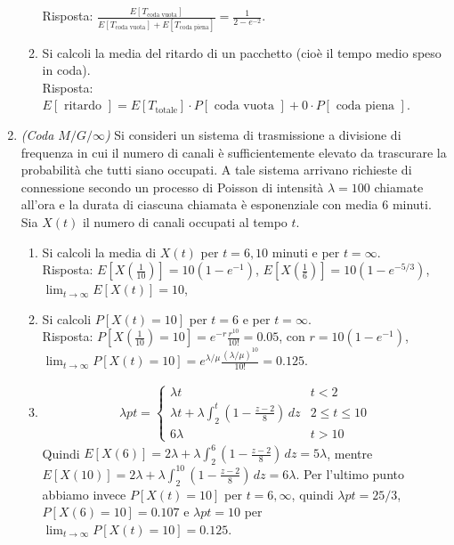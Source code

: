 \documentclass{article}
\begin{document}
\begin{enumerate}
\begin{enumerate}[label=\alph*)]
        Risposta: $\frac{E[T_{\text{coda vuota}}]}{E[T_{\text{coda vuota}}] + E[T_{\text{coda piena}}]} = \frac{1}{2-e^{-2}}$.
        \item Si calcoli la media del ritardo di un pacchetto (cioè il tempo medio speso in coda).\\
        
        Risposta: $E[\text{ ritardo }] = E[T_{\text{totale}}] \cdot P[\text{ coda vuota }] + 0\cdot P[\text{ coda piena }]$.
    \end{enumerate}

    \item \emph{(Coda $M/G/\infty$)} Si consideri un sistema di trasmissione a divisione di frequenza in cui il numero di canali è sufficientemente elevato da trascurare la probabilità che tutti siano occupati.
    A tale sistema arrivano richieste di connessione secondo un processo di Poisson di intensità $\lambda = 100$ chiamate all'ora e la durata di ciascuna chiamata è esponenziale con media 6 minuti.
    Sia $X(t)$ il numero di canali occupati al tempo $t$.
    \begin{enumerate}[label=\alph*)]
        \item Si calcoli la media di $X(t)$ per $t=6,10$ minuti e per $t=\infty$.\\
        
        Risposta: $E[X(\frac{1}{10})] = 10(1-e^{-1})$, $E[X(\frac{1}{6})] = 10(1-e^{-5/3})$, $\lim_{t\to\infty}E[X(t)] = 10$, 
        
        \item Si calcoli $P[X(t)=10]$ per $t=6$ e per $t=\infty$.\\
        
        Risposta: $P[X(\frac{1}{10})=10]=e^{-r}\frac{r^{10}}{10!} = 0.05$, con $r=10(1-e^{-1})$, $\lim_{t\to\infty}P[X(t) = 10] = e^{\lambda / \mu}\frac{(\lambda / \mu)^{10}}{10!}= 0.125$.
        \item
        \begin{align*}
        \lambda p t = \begin{cases}
        \lambda t & t < 2\\
        \lambda t + \lambda \int_2^t \left(1-\frac{z-2}{8}\right)\,dz & 2\le t\le10\\
        6\lambda & t > 10
        \end{cases}
        \end{align*}
        Quindi $E[X(6)] = 2\lambda + \lambda \int_2^6 \left(1-\frac{z-2}{8}\right)\,dz = 5\lambda$, mentre $E[X(10)] = 2\lambda + \lambda \int_2^{10} \left(1-\frac{z-2}{8}\right)\,dz = 6\lambda$.
        Per l'ultimo punto abbiamo invece $P[X(t) = 10]$ per $t=6,\infty$, quindi $\lambda p t = 25/3$, $P[X(6)=10] = 0.107$ e $\lambda p t = 10$ per $\lim_{t\to\infty}P[X(t)=10]=0.125$. 
    \end{enumerate}


\end{enumerate}
\end{document}
